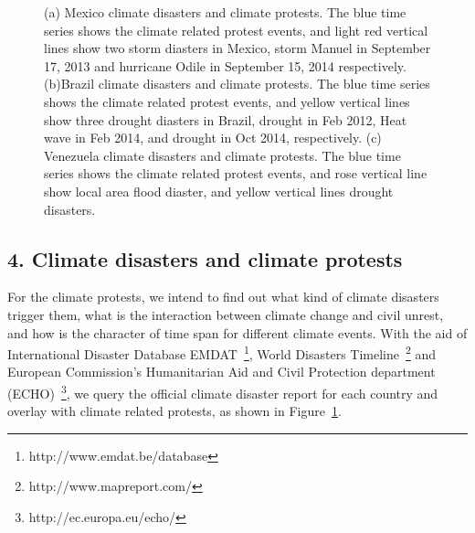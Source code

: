\documentclass[9pt,twocolumn,twoside]{pnas-new}
\begin{document}
\begin{figure}[ht]
	\centering
	\caption{(a) Mexico climate disasters and climate protests. The blue time series shows the climate related protest events, and light red vertical lines show two storm diasters in Mexico, storm Manuel in September 17, 2013 and hurricane Odile in September 15, 2014 respectively. (b)Brazil climate disasters and climate protests. The blue time series shows the climate related protest events, and yellow vertical lines show three drought diasters in Brazil, drought in Feb 2012, Heat wave in Feb 2014, and drought in Oct 2014, respectively. (c) Venezuela climate disasters and climate protests. The blue time series shows the climate related protest events, and rose vertical line show local area flood diaster, and yellow vertical lines drought disasters.}
\label{climate-timeseries}
\end{figure}


\subsection{4. Climate disasters and climate protests}
For the climate protests, we intend to find out what kind of climate disasters trigger them, what is the interaction between climate change and civil unrest, and how is the character of time span for different climate events. With the aid of International Disaster Database EMDAT~\footnote{http://www.emdat.be/database}, World Disasters Timeline~\footnote{http://www.mapreport.com/} and European Commission's Humanitarian Aid and Civil Protection department (ECHO)~\footnote{http://ec.europa.eu/echo/}, we query the official climate disaster report for each country and overlay with climate related protests, as shown in Figure~\ref{climate-timeseries}.
\end{document}
